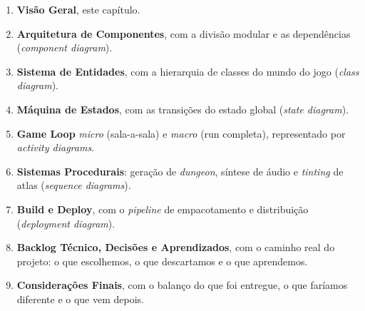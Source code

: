 \begin{enumerate}
  \item \textbf{Visão Geral}, este capítulo.
  \item \textbf{Arquitetura de Componentes}, com a divisão modular e as dependências
    (\textit{component diagram}).
  \item \textbf{Sistema de Entidades}, com a hierarquia de classes do mundo do jogo
    (\textit{class diagram}).
  \item \textbf{Máquina de Estados}, com as transições do estado global
    (\textit{state diagram}).
  \item \textbf{Game Loop} \textit{micro} (sala-a-sala) e \textit{macro} (run completa),
    representado por \textit{activity diagrams}.
  \item \textbf{Sistemas Procedurais}: geração de \emph{dungeon}, síntese de áudio e
    \textit{tinting} de atlas (\textit{sequence diagrams}).
  \item \textbf{Build e Deploy}, com o \emph{pipeline} de empacotamento e distribuição
    (\textit{deployment diagram}).
  \item \textbf{Backlog Técnico, Decisões e Aprendizados}, com o caminho real do
    projeto: o que escolhemos, o que descartamos e o que aprendemos.
  \item \textbf{Considerações Finais}, com o balanço do que foi entregue, o que
    faríamos diferente e o que vem depois.
\end{enumerate}
